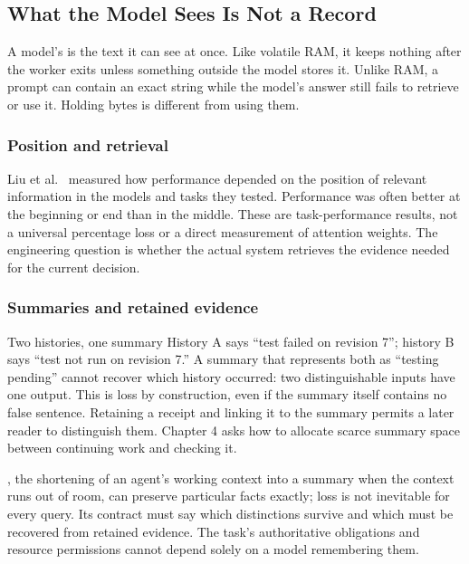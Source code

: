 \subsection{What the Model Sees Is Not a Record}\label{sec:prereq-context-record}

A model's  is the text it can see at once. Like
volatile RAM, it keeps nothing after the worker exits unless something
outside the model stores it. Unlike RAM, a prompt can contain an exact string while
the model's answer still fails to retrieve or use it. Holding bytes is
different from using them.

\subsubsection{Position and retrieval}
Liu et al.~ measured how performance depended on the position
of relevant information in the models and tasks they tested. Performance was often better
at the beginning or end than in the middle. These are task-performance results,
not a universal percentage loss or a direct measurement of attention weights.
The engineering question is whether the actual system retrieves the evidence
needed for the current decision.

\subsubsection{Summaries and retained evidence}
\begin{pdexample}{Two histories, one summary}
History A says ``test failed on revision 7''; history B says ``test not run on
revision 7.'' A summary that represents both as ``testing pending'' cannot
recover which history occurred: two distinguishable inputs have one output. This is loss by construction, even if the
summary itself contains no false sentence. Retaining a receipt and linking it
to the summary permits a later reader to distinguish them. Chapter 4 asks how
to allocate scarce summary space between continuing work and checking it.
\end{pdexample}
, the shortening of an agent's working context into a
summary when the context runs out of room, can preserve particular facts
exactly; loss is not inevitable for every query. Its contract must say which distinctions survive and which must
be recovered from retained evidence. The task's authoritative obligations and
resource permissions cannot depend solely on a model remembering them.


